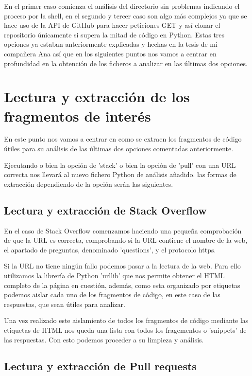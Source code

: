\documentclass[a4paper, 12pt]{book}
\begin{document}
En el primer caso comienza el análisis del directorio sin problemas indicando el proceso por la shell, en el segundo y tercer caso son algo más complejos ya que se hace uso de la API de GitHub para hacer peticiones GET y así clonar el repositorio únicamente si supera la mitad de código en Python. Estas tres opciones ya estaban anteriormente explicadas y hechas en la tesis de mi compañera Ana así que en los siguientes puntos nos vamos a centrar en profundidad en la obtención de los ficheros a analizar en las últimas dos opciones.

\section{Lectura y extracción de los fragmentos de interés} 
\label{sec:Obtención de ficheros en las diferentes opciones}

En este punto nos vamos a centrar en como se extraen los fragmentos de código útiles para su análisis de las últimas dos opciones comentadas anteriormente.

Ejecutando o bien la opción de 'stack' o bien la opción de 'pull' con una URL correcta nos llevará al nuevo fichero Python de análisis añadido. las formas de extracción dependiendo de la opción serán las siguientes.

\subsection{Lectura y extracción de Stack Overflow}

En el caso de Stack Overflow comenzamos haciendo una pequeña comprobación de que la URL es correcta, comprobando si la URL contiene el nombre de la web, el apartado de preguntas, denominado 'questions', y el protocolo https.

Si la URL no tiene ningún fallo podemos pasar a la lectura de la web. Para ello utilizamos la librería de 
Python 'urllib'\cite{website:Urllib} que nos permite obtener el HTML completo de la página en cuestión, además, como esta organizado por etiquetas podemos aislar cada uno de los fragmentos de código, en este caso de las respuestas, que sean útiles para analizar.

Una vez realizado este aislamiento de todos los fragmentos de código mediante las etiquetas de HTML nos queda una lista con todos los fragementos o 'snippets' de las respuestas. Con esto podemos proceder a su limpieza y análisis.

\subsection{Lectura y extracción de Pull requests}
\end{document}

